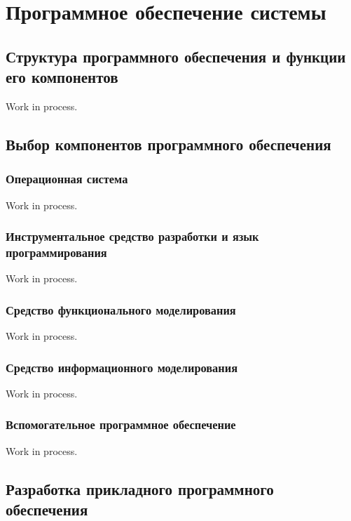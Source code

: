 \section{Программное обеспечение системы}

\subsection{Структура программного обеспечения и функции его компонентов}

Work in process.

\subsection{Выбор компонентов программного обеспечения}

\subsubsection{Операционная система}

Work in process.

\subsubsection{Инструментальное средство разработки и язык программирования}

Work in process.

\subsubsection{Средство функционального моделирования}

Work in process.

\subsubsection{Средство информационного моделирования}

Work in process.

\subsubsection{Вспомогательное программное обеспечение}

Work in process.

\subsection{Разработка прикладного программного обеспечения}


